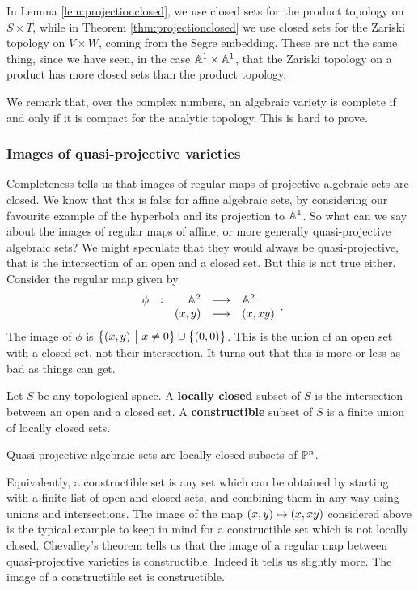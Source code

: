 \pagebreak

\begin{note*}
In Lemma \ref{lem:projectionclosed}, we use closed sets for the product topology on $ S \times T $, while in Theorem \ref{thm:projectionclosed} we use closed sets for the Zariski topology on $ V \times W $, coming from the Segre embedding. These are not the same thing, since we have seen, in the case $ \AA^1 \times \AA^1 $, that the Zariski topology on a product has more closed sets than the product topology.
\end{note*}

We remark that, over the complex numbers, an algebraic variety is complete if and only if it is compact for the analytic topology. This is hard to prove.

\subsubsection{Images of quasi-projective varieties}

Completeness tells us that images of regular maps of projective algebraic sets are closed. We know that this is false for affine algebraic sets, by considering our favourite example of the hyperbola and its projection to $ \AA^1 $. So what can we say about the images of regular maps of affine, or more generally quasi-projective algebraic sets? We might speculate that they would always be quasi-projective, that is the intersection of an open and a closed set. But this is not true either. Consider the regular map given by
$$ \function[\phi]{\AA^2}{\AA^2}{\br{x, y}}{\br{x, xy}}. $$
The image of $ \phi $ is $ \cbr{\br{x, y} \st x \ne 0} \cup \cbr{\br{0, 0}} $. This is the union of an open set with a closed set, not their intersection. It turns out that this is more or less as bad as things can get.

\begin{definition*}
Let $ S $ be any topological space. A \textbf{locally closed} subset of $ S $ is the intersection between an open and a closed set. A \textbf{constructible} subset of $ S $ is a finite union of locally closed sets.
\end{definition*}

\begin{example*}
Quasi-projective algebraic sets are locally closed subsets of $ \PP^n $.
\end{example*}

Equivalently, a constructible set is any set which can be obtained by starting with a finite list of open and closed sets, and combining them in any way using unions and intersections. The image of the map $ \br{x, y} \mapsto \br{x, xy} $ considered above is the typical example to keep in mind for a constructible set which is not locally closed. Chevalley's theorem tells us that the image of a regular map between quasi-projective varieties is constructible. Indeed it tells us slightly more. The image of a constructible set is constructible.

